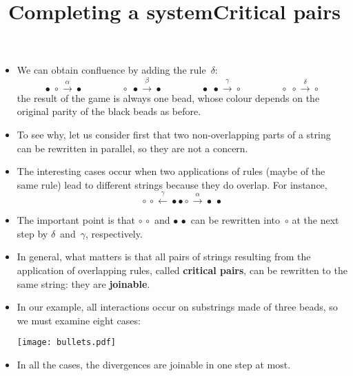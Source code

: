 \documentclass[wide]{slides}
\begin{document}
\begin{slide}
  \title{Completing a system}

  \begin{itemize}

    \item We can obtain confluence by adding the rule~\(\delta\):
      \begin{equation*}
        \bullet \; \circ   \xrightarrow{\alpha} \bullet\qquad\qquad
        \circ   \; \bullet \xrightarrow{\beta} \bullet\qquad\qquad
        \bullet \; \bullet \xrightarrow{\gamma}
        \circ\qquad\qquad
        \circ\; \circ \xrightarrow{\delta} \circ
      \end{equation*}
      the result of the game is always one bead, whose colour depends
      on the original parity of the black beads as before.

    \item To see why, let us consider first that two
      non\hyp{}overlapping parts of a string can be rewritten in
      parallel, so they are not a concern.

    \item The interesting cases occur when two applications of rules
      (maybe of the same rule) lead to different strings because they
      do overlap. For instance,
      \begin{equation*}
        \circ \, \circ \xleftarrow{\gamma} \bullet \bullet
        \circ \xrightarrow{\alpha} \bullet \, \bullet
      \end{equation*}

    \item The important point is that \(\circ \, \circ\) and \(\bullet
      \, \bullet\) can be rewritten into~\(\circ\) at the next step by
      \(\delta\)~and~\(\gamma\), respectively.

  \end{itemize}

\end{slide}

\begin{slide}
  \title{Critical pairs}

  \begin{itemize}

    \item In general, what matters is that all pairs of strings
      resulting from the application of overlapping rules, called
      \textbf{critical pairs}, can be rewritten to the same string:
      they are \textbf{joinable}.

    \item In our example, all interactions occur on substrings made of
      three beads, so we must examine eight cases:
      \begin{center}
        \texttt{[image: bullets.pdf]}
      \end{center}

    \item In all the cases, the divergences are joinable in one step
      at most.

  \end{itemize}

\end{slide}
\end{document}
